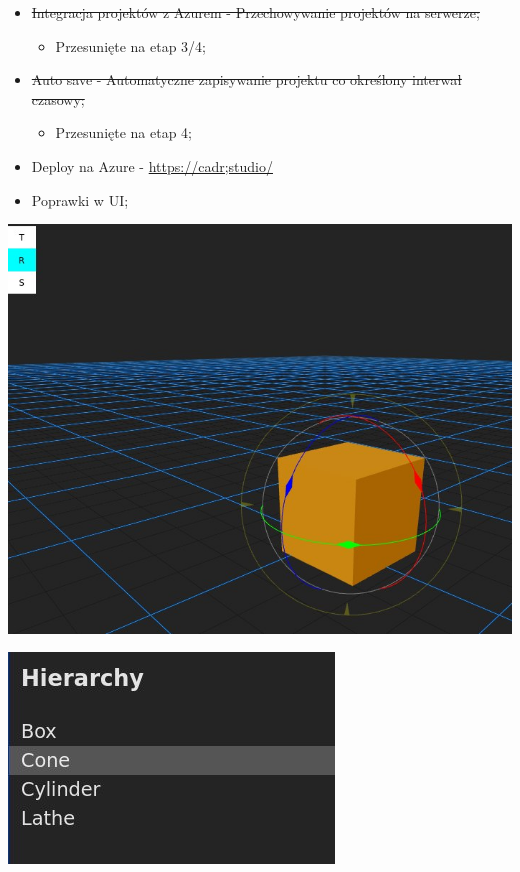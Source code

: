 \documentclass[11pt]{article}
\begin{document}
\begin{itemize}
\item \sout{Integracja projektów z Azurem - Przechowywanie projektów na serwerze;}
\begin{itemize}
\item Przesunięte na etap 3/4;
\end{itemize}
\item \sout{Auto save - Automatyczne zapisywanie projektu co określony interwał czasowy;}
\begin{itemize}
\item Przesunięte na etap 4;
\end{itemize}
\item Deploy na Azure - \url{https://cadr;studio/}
\item Poprawki w UI;
\end{itemize}
\begin{center}
\includegraphics[width=.9\linewidth]{./img/toolbar.jpg}
\end{center}
\begin{center}
\includegraphics[width=.9\linewidth]{./img/hierarchy.jpg}
\end{center}
\end{document}
